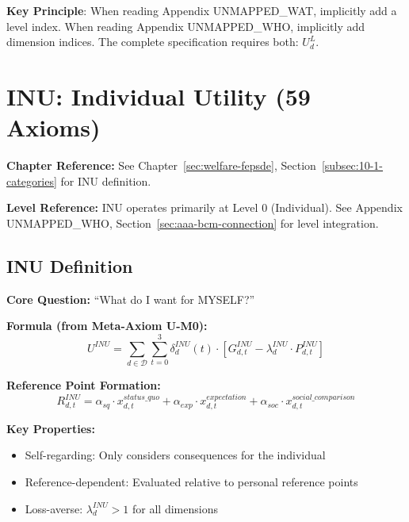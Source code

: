 \textbf{Key Principle}: When reading Appendix UNMAPPED_WAT, implicitly add a level index. 
When reading Appendix UNMAPPED_WHO, implicitly add dimension indices. The complete 
specification requires both: $U^L_d$.

\section{INU: Individual Utility (59 Axioms)}
\label{sec:app-c-inu}

\begin{cross-reference}
\textbf{Chapter Reference:} See Chapter~\ref{sec:welfare-fepsde}, 
Section~\ref{subsec:10-1-categories} for INU definition.

\textbf{Level Reference:} INU operates primarily at Level 0 (Individual). 
See Appendix UNMAPPED_WHO, Section~\ref{sec:aaa-bcm-connection} for level integration.
\end{cross-reference}

\subsection{INU Definition}

\begin{tcolorbox}[colback=blue!5!white, colframe=blue!75!black, 
    title=Individual Utility (INU)]

\textbf{Core Question:} ``What do I want for MYSELF?''

\textbf{Formula (from Meta-Axiom U-M0):}
\begin{equation}
U^{INU} = \sum_{d \in \mathcal{D}} \sum_{t=0}^{3} \delta^{INU}_{d}(t) \cdot 
\left[ G^{INU}_{d,t} - \lambda^{INU}_{d} \cdot P^{INU}_{d,t} \right]
\end{equation}

\textbf{Reference Point Formation:}
\begin{equation}
R^{INU}_{d,t} = \alpha_{sq} \cdot x^{status\_quo}_{d,t} + 
               \alpha_{exp} \cdot x^{expectation}_{d,t} + 
               \alpha_{soc} \cdot x^{social\_comparison}_{d,t}
\end{equation}

\textbf{Key Properties:}
\begin{itemize}
\item Self-regarding: Only considers consequences for the individual
\item Reference-dependent: Evaluated relative to personal reference points
\item Loss-averse: $\lambda^{INU}_d > 1$ for all dimensions
\end{itemize}

\end{tcolorbox}

